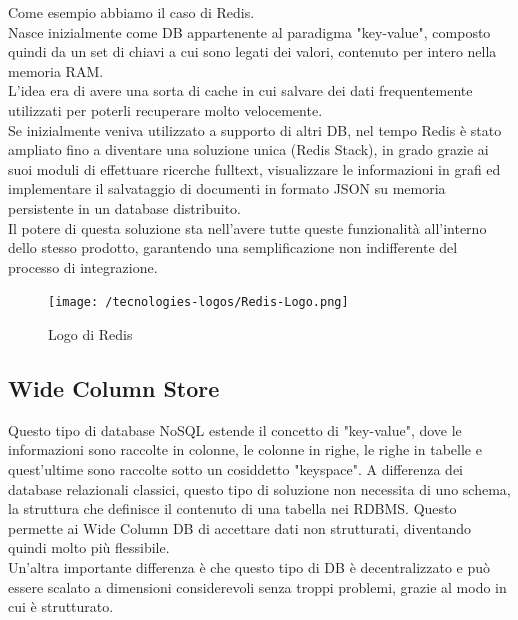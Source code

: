 \noindent Come esempio abbiamo il caso di Redis.\\
Nasce inizialmente come DB appartenente al paradigma "key-value", composto quindi da un set di chiavi a cui sono legati dei valori, contenuto per intero nella memoria RAM.\\
L'idea era di avere una sorta di cache in cui salvare dei dati frequentemente utilizzati per poterli recuperare molto velocemente.\\
Se inizialmente veniva utilizzato a supporto di altri DB, nel tempo Redis è stato ampliato fino a diventare una soluzione unica (Redis Stack), in grado grazie ai suoi moduli di effettuare ricerche fulltext, visualizzare le informazioni in grafi ed implementare il salvataggio di documenti in formato JSON su memoria persistente in un database distribuito.\\
Il potere di questa soluzione sta nell'avere tutte queste funzionalità all'interno dello stesso prodotto, garantendo una semplificazione non indifferente del processo di integrazione.

\begin{figure}[htbp]
\begin{center}
\texttt{[image: /tecnologies-logos/Redis-Logo.png]}
\caption{Logo di Redis}
\end{center}
\end{figure}

\subsection{Wide Column Store}
Questo tipo di database NoSQL estende il concetto di "key-value", dove le informazioni sono raccolte in colonne, le colonne in righe, le righe in tabelle e quest'ultime sono raccolte sotto un cosiddetto "keyspace". A differenza dei database relazionali classici, questo tipo di soluzione non necessita di uno schema, la struttura che definisce il contenuto di una tabella nei RDBMS. Questo permette ai Wide Column DB di accettare dati non strutturati, diventando quindi molto più flessibile.\\
Un'altra importante differenza è che questo tipo di DB è decentralizzato e può essere scalato a dimensioni considerevoli senza troppi problemi, grazie al modo in cui è strutturato.\\

